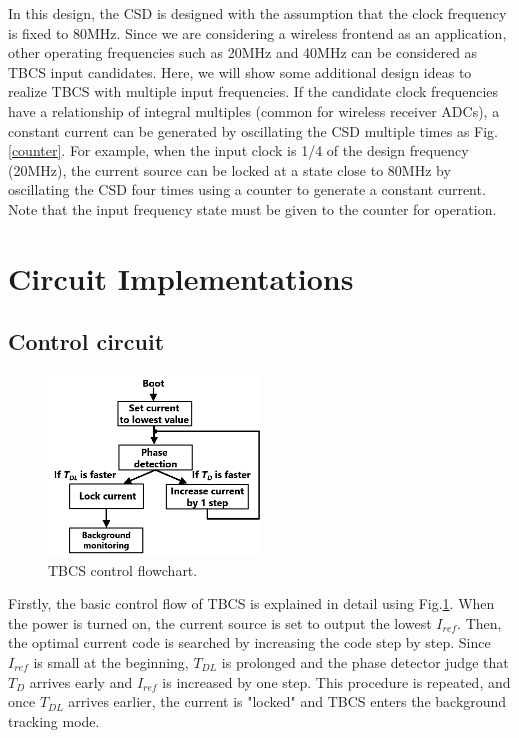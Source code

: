 \documentclass[paper]{ieice}
\begin{document}
In this design, the CSD is designed with the assumption that the clock frequency is fixed to 80MHz. Since we are considering a wireless frontend as an application, other operating frequencies such as 20MHz and 40MHz can be considered as TBCS input candidates. %
Here, we will show some additional design ideas to realize TBCS with multiple input frequencies. If the candidate clock frequencies have a relationship of integral multiples (common for wireless receiver ADCs), a constant current can be generated by oscillating the CSD multiple times as Fig.\ref{counter}. For example, when the input clock is 1/4 of the design frequency (20MHz), the current source can be locked at a state close to 80MHz by oscillating the CSD four times using a counter to generate a constant current. Note that the input frequency state must be given to the counter for operation.


\section{Circuit Implementations}
\subsection{Control circuit}
\begin{figure}[!t]
\centering
 \includegraphics[width=0.5\textwidth]{figs/flowchart.png}
  \caption{TBCS control flowchart.}
\label{flow}
\end{figure}
Firstly, the basic control flow of TBCS is explained in detail using Fig.\ref{flow}. When the power is turned on, the current source is set to output the lowest $I_{ref}$. Then, the optimal current code is searched by increasing the code step by step. Since $I_{ref}$ is small at the beginning, $T_{DL}$ is prolonged and the phase detector judge that $T_D$ arrives early and $I_{ref}$ is increased by one step. This procedure is repeated, and once $T_{DL}$ arrives earlier, the current is "locked" and TBCS enters the background tracking mode.
\end{document}
